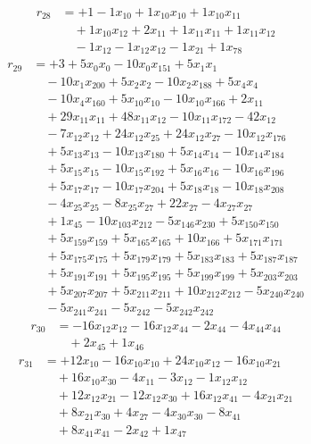 \[\begin{aligned}
r_{28} &= + 1 - 1 x_{10} + 1 x_{10} x_{10} + 1 x_{10} x_{11} \\
 &\quad + 1 x_{10} x_{12} + 2 x_{11} + 1 x_{11} x_{11} + 1 x_{11} x_{12} \\
 &\quad - 1 x_{12} - 1 x_{12} x_{12} - 1 x_{21} + 1 x_{78}
\end{aligned}\]
\[\begin{aligned}
r_{29} &= + 3 + 5 x_{0} x_{0} - 10 x_{0} x_{151} + 5 x_{1} x_{1} \\
 &\quad - 10 x_{1} x_{200} + 5 x_{2} x_{2} - 10 x_{2} x_{188} + 5 x_{4} x_{4} \\
 &\quad - 10 x_{4} x_{160} + 5 x_{10} x_{10} - 10 x_{10} x_{166} + 2 x_{11} \\
 &\quad + 29 x_{11} x_{11} + 48 x_{11} x_{12} - 10 x_{11} x_{172} - 42 x_{12} \\
 &\quad - 7 x_{12} x_{12} + 24 x_{12} x_{25} + 24 x_{12} x_{27} - 10 x_{12} x_{176} \\
 &\quad + 5 x_{13} x_{13} - 10 x_{13} x_{180} + 5 x_{14} x_{14} - 10 x_{14} x_{184} \\
 &\quad + 5 x_{15} x_{15} - 10 x_{15} x_{192} + 5 x_{16} x_{16} - 10 x_{16} x_{196} \\
 &\quad + 5 x_{17} x_{17} - 10 x_{17} x_{204} + 5 x_{18} x_{18} - 10 x_{18} x_{208} \\
 &\quad - 4 x_{25} x_{25} - 8 x_{25} x_{27} + 22 x_{27} - 4 x_{27} x_{27} \\
 &\quad + 1 x_{45} - 10 x_{103} x_{212} - 5 x_{146} x_{230} + 5 x_{150} x_{150} \\
 &\quad + 5 x_{159} x_{159} + 5 x_{165} x_{165} + 10 x_{166} + 5 x_{171} x_{171} \\
 &\quad + 5 x_{175} x_{175} + 5 x_{179} x_{179} + 5 x_{183} x_{183} + 5 x_{187} x_{187} \\
 &\quad + 5 x_{191} x_{191} + 5 x_{195} x_{195} + 5 x_{199} x_{199} + 5 x_{203} x_{203} \\
 &\quad + 5 x_{207} x_{207} + 5 x_{211} x_{211} + 10 x_{212} x_{212} - 5 x_{240} x_{240} \\
 &\quad - 5 x_{241} x_{241} - 5 x_{242} - 5 x_{242} x_{242}
\end{aligned}\]
\[\begin{aligned}
r_{30} &= - 16 x_{12} x_{12} - 16 x_{12} x_{44} - 2 x_{44} - 4 x_{44} x_{44} \\
 &\quad + 2 x_{45} + 1 x_{46}
\end{aligned}\]
\[\begin{aligned}
r_{31} &= + 12 x_{10} - 16 x_{10} x_{10} + 24 x_{10} x_{12} - 16 x_{10} x_{21} \\
 &\quad + 16 x_{10} x_{30} - 4 x_{11} - 3 x_{12} - 1 x_{12} x_{12} \\
 &\quad + 12 x_{12} x_{21} - 12 x_{12} x_{30} + 16 x_{12} x_{41} - 4 x_{21} x_{21} \\
 &\quad + 8 x_{21} x_{30} + 4 x_{27} - 4 x_{30} x_{30} - 8 x_{41} \\
 &\quad + 8 x_{41} x_{41} - 2 x_{42} + 1 x_{47}
\end{aligned}\]
